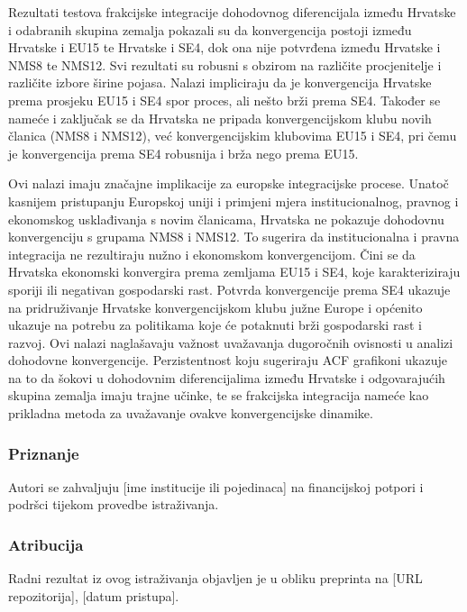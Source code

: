 \documentclass{crebsshr}
\begin{document}
    Rezultati testova frakcijske integracije dohodovnog diferencijala između Hrvatske i odabranih skupina zemalja pokazali su da konvergencija postoji između Hrvatske i EU15 te Hrvatske i SE4, dok ona nije potvrđena između Hrvatske i NMS8 te NMS12. Svi rezultati su robusni s obzirom na različite procjenitelje i različite izbore širine pojasa. Nalazi impliciraju da je konvergencija Hrvatske prema prosjeku EU15 i SE4 spor proces, ali nešto brži prema SE4. Također se nameće i zaključak se da Hrvatska ne pripada konvergencijskom klubu novih članica (NMS8 i NMS12), već konvergencijskim klubovima EU15 i SE4, pri čemu je konvergencija prema SE4 robusnija i brža nego prema EU15.
    
    Ovi nalazi imaju značajne implikacije za europske integracijske procese. Unatoč kasnijem pristupanju Europskoj uniji i primjeni mjera institucionalnog, pravnog i ekonomskog usklađivanja s novim članicama, Hrvatska ne pokazuje dohodovnu konvergenciju s grupama NMS8 i NMS12. To sugerira da institucionalna i pravna integracija ne rezultiraju nužno i ekonomskom konvergencijom. Čini se da Hrvatska ekonomski konvergira prema zemljama EU15 i SE4, koje karakteriziraju sporiji ili negativan gospodarski rast. Potvrda konvergencije prema SE4 ukazuje na pridruživanje Hrvatske konvergencijskom klubu južne Europe i općenito ukazuje na potrebu za politikama koje će potaknuti brži gospodarski rast i razvoj. Ovi nalazi naglašavaju važnost uvažavanja dugoročnih ovisnosti u analizi dohodovne konvergencije. Perzistentnost koju sugeriraju ACF grafikoni ukazuje na to da šokovi u dohodovnim diferencijalima između Hrvatske i odgovarajućih skupina zemalja imaju trajne učinke, te se frakcijska integracija nameće kao prikladna metoda za uvažavanje ovakve konvergencijske dinamike.
    
    \subsubsection*{Priznanje}
    Autori se zahvaljuju [ime institucije ili pojedinaca] na financijskoj potpori i podršci tijekom provedbe istraživanja.

    \subsubsection*{Atribucija}
    Radni rezultat iz ovog istraživanja objavljen je u obliku preprinta na [URL repozitorija], [datum pristupa].

    \newpage
\end{document}
